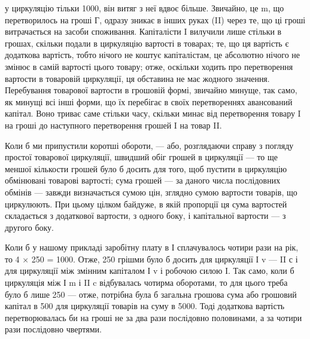 \parcont{}  %
у циркуляцію тільки 1000, він витяг з неї вдвоє більше. Звичайно,
це m, що перетворилось на гроші Г, одразу зникає в інших руках
(II) через те, що ці гроші витрачається на засоби споживання. Капіталісти I
вилучили лише стільки в грошах, скільки подали в циркуляцію вартості
в товарах; те, що ця вартість є додаткова вартість, тобто нічого не коштує
капіталістам, це абсолютно нічого не змінює в самій вартості цього товару;
отже, оскільки ходить про перетворення вартости в товаровій циркуляції,
ця обставина не має жодного значення. Перебування товарової вартости
в грошовій формі, звичайно минуще, так само, як минущі всі інші форми,
що їх перебігає в своїх перетвореннях авансований капітал. Воно триває
саме стільки часу, скільки минає від перетворення товару I на гроші до
наступного перетворення грошей I на товар II.

Коли б ми припустили коротші обороти, — або, розглядаючи справу
з погляду простої товарової циркуляції, швидший обіг грошей в циркуляції
— то ще меншої кількости грошей було б досить для того, щоб
пустити в циркуляцію обмінювані товарові вартості; сума грошей — за
даного числа послідовних обмінів — завжди визначається сумою цін, зглядно
сумою вартости товарів, що циркулюють. При цьому цілком байдуже,
в якій пропорції ця сума вартостей складається з додаткової вартости,
з одного боку, і капітальної вартости — з другого боку.

Коли б у нашому прикладі заробітну плату в І сплачувалось чотири
рази на рік, то 4 × 250 = 1000. Отже, 250 грішми було б
досить для циркуляції І v —  II с і для циркуляції між змінним капіталом
І v і робочою силою І. Так само, коли б циркуляція між І m і
II c відбувалась чотирма оборотами, то для цього треба було б лише
250 — отже, потрібна була б загальна грошова сума або грошовий
капітал в 500 для циркуляції товарів на суму в 5000.
Тоді додаткова вартість перетворювалась би на гроші не за два рази
послідовно половинами, а за чотири рази послідовно чвертями.

